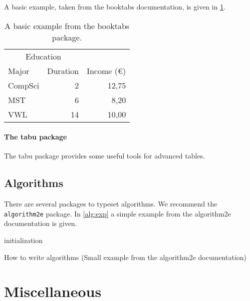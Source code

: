 \documentclass[8pt, %
a5paper, %
twoside, %
openright, %
abstract=off, %
DIV=11,      %
BCOR=8mm]{scrbook} %
\begin{document}
    A basic  example, taken  from the booktabs  documentation, is  given in
    \cref{tab::ex}.

    \begin{table}
        \centering
        \begin{tabular}{@{}lrr@{}} 
            \toprule
            \multicolumn{2}{c}{Education}\\ \cmidrule{1-2}
            Major & Duration & Income (\euro)\\ 
            \midrule 
            CompSci & 2 & 12,75 \\ \addlinespace
            MST & 6 & 8,20 \\ \addlinespace
            VWL & 14 & 10,00\\ 
            \bottomrule
        \end{tabular}
        \caption[Table Example]{A basic example from the booktabs package.}
        \label{tab::ex}
    \end{table}

    \paragraph{The tabu package}
    The tabu package provides some useful tools for advanced tables.


    \subsection{Algorithms}
    There are several packages to typeset algorithms.
    We recommend the \verb+algorithm2e+ package.
    In \cref{alg:exp} a simple example from the algorithm2e documentation is given.

    \begin{algorithm}[t]
        \SetAlgoLined
        initialization\;
        \caption{How to write algorithms (Small example from the algorithm2e documentation)}
        \label{alg:exp}
    \end{algorithm}

    \section{Miscellaneous}
\end{document}
